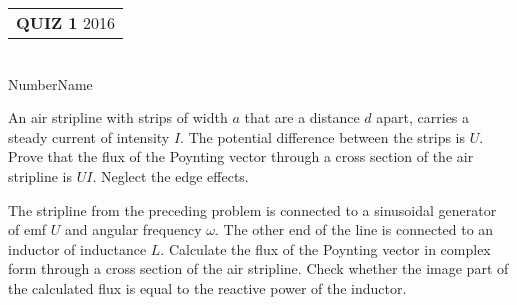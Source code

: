 \documentclass[a4paper,12pt]{examdesign}
\begin{document}
\newcommand{\bhline}{\noalign{\hrule height 1pt}}
\SectionPrefix{}
\NoKey
\NoRearrange
\ShortKey
{}
\SectionFont{\large\bf}
\DefineAnswerWrapper{\begin{description}\item [\AnswerLeading:]}{\end{description}}
\def\namedata{\large
Number\underline{\hspace{121pt}}Name\underline{\hspace{98pt}}}
\begin{examtop}
\begin{center}
\begin{tabular}{r}
    {\Large \bf QUIZ 1}
    {\large \hspace{48pt}2016 }
\end{tabular} \medskip \\
\namedata
\end{center}
\end{examtop}

\newcommand\mathdot[1]{\dot#1}

\begin{shortanswer}

\begin{question}
    An air stripline with strips of width $a$ that are a distance $d$
    apart, carries a steady current of intensity $I$. The potential
    difference between the strips is $U$. Prove that the flux of the
    Poynting vector through a cross section of the air stripline is
    $UI$. Neglect the edge effects.
\end{question}

\begin{question}
    The stripline from the preceding problem is connected to a
    sinusoidal generator of emf $U$ and angular frequency $\omega$. The
    other end of the line is connected to an inductor of inductance $L$.
    Calculate the flux of the Poynting vector in complex form through a
    cross section of the air stripline. Check whether the image part of
    the calculated flux is equal to the reactive power of the inductor.
\end{question}

\end{shortanswer}
\end{document}
